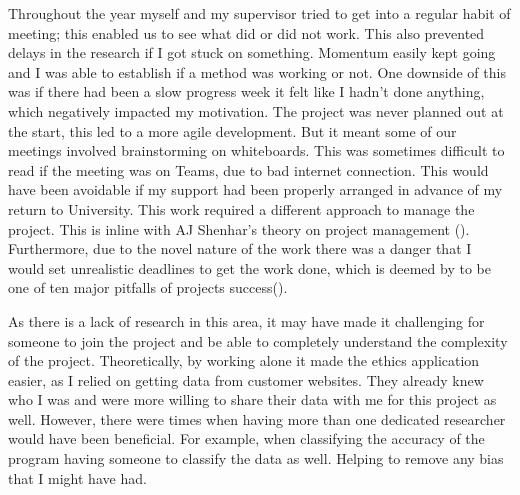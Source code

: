 Throughout the year myself and my supervisor tried to get into a regular habit of meeting; this enabled us to see what did or did not work.  This also prevented delays in the research if I got stuck on something. Momentum easily kept going and I was able to establish if a method was working or not. One downside of this was if there had been a slow progress week it felt like I hadn't done anything, which negatively impacted my motivation. The project was never planned out at the start, this led to a more agile development. But it meant some of our meetings involved brainstorming on whiteboards. This was sometimes difficult to read if the meeting was on Teams, due to bad internet connection. This would have been avoidable if my support had been properly arranged in advance of my return to University. This work required a different approach to manage the project. This is inline with AJ Shenhar's theory on project management (\cite{Shenhar1}). Furthermore, due to the novel nature of the work there was a danger that I would set unrealistic deadlines to get the work done, which is deemed by \citeauthor{GanttPRO} to be one of ten major pitfalls of projects success(\cite{GanttPRO}).



As there is a lack of research in this area, it may have made it challenging for someone to join the project and be able to completely understand the complexity of the project. Theoretically, by working alone it made the ethics application easier, as I relied on getting data from customer websites. They already knew who I was and were more willing to share their data with me for this project as well. However, there were times when having more than one dedicated researcher would have been beneficial. For example, when classifying the accuracy of the program having someone to classify the data as well. Helping to remove any bias that I might have had.

